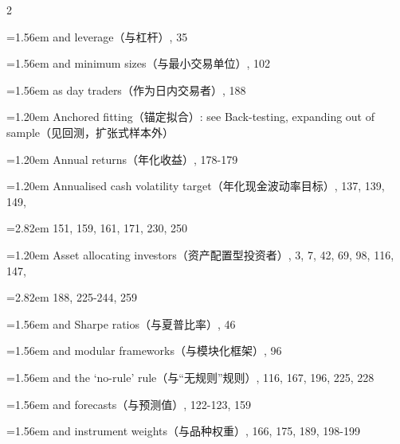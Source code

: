 {\begin{multicols}{2}
\par \noindent\hangindent=1.56em\hspace*{0.36em} and leverage（与杠杆）, 35
\par \noindent\hangindent=1.56em\hspace*{0.36em} and minimum sizes（与最小交易单位）, 102
\par \noindent\hangindent=1.56em\hspace*{0.36em} as day traders（作为日内交易者）, 188
\par \noindent\hangindent=1.20em\hspace*{0.00em} Anchored fitting（锚定拟合）: see Back-testing, expanding out of sample（见回测，扩张式样本外）
\par \noindent\hangindent=1.20em\hspace*{0.00em} Annual returns（年化收益）, 178-179
\par \noindent\hangindent=1.20em\hspace*{0.00em} Annualised cash volatility target（年化现金波动率目标）, 137, 139, 149,
\par \noindent\hangindent=2.82em\hspace*{1.62em} 151, 159, 161, 171, 230, 250
\par \noindent\hangindent=1.20em\hspace*{0.00em} Asset allocating investors（资产配置型投资者）, 3, 7, 42, 69, 98, 116, 147,
\par \noindent\hangindent=2.82em\hspace*{1.62em} 188, 225-244, 259
\par \noindent\hangindent=1.56em\hspace*{0.36em} and Sharpe ratios（与夏普比率）, 46
\par \noindent\hangindent=1.56em\hspace*{0.36em} and modular frameworks（与模块化框架）, 96
\par \noindent\hangindent=1.56em\hspace*{0.36em} and the ‘no-rule’ rule（与“无规则”规则）, 116, 167, 196, 225, 228
\par \noindent\hangindent=1.56em\hspace*{0.36em} and forecasts（与预测值）, 122-123, 159
\par \noindent\hangindent=1.56em\hspace*{0.36em} and instrument weights（与品种权重）, 166, 175, 189, 198-199

\end{multicols}}
